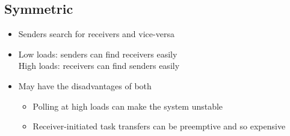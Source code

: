 \documentclass{article}[18pt]
\begin{document}
\subsection{Symmetric}
\begin{itemize}
	\item Senders search for receivers and vice-versa
	\item Low loads: senders can find receivers easily\\
	High loads: receivers can find senders easily
	\item May have the disadvantages of both
	\begin{itemize}
		\item Polling at high loads can make the system unstable
		\item Receiver-initiated task transfers can be preemptive and so expensive
	\end{itemize}
\end{itemize}
\end{document}

